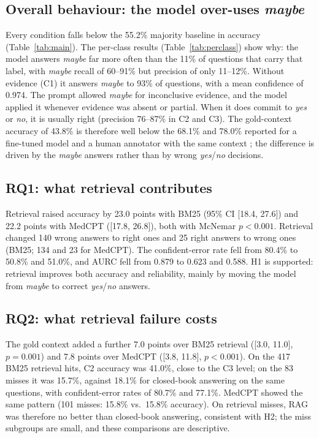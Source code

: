 \documentclass[conference]{IEEEtran}
\begin{document}
\subsection{Overall behaviour: the model over-uses \emph{maybe}}
Every condition falls below the 55.2\% majority baseline in accuracy
(Table~\ref{tab:main}). The per-class results (Table~\ref{tab:perclass}) show
why: the model answers \emph{maybe} far more often than the 11\% of questions
that carry that label, with \emph{maybe} recall of 60--91\% but precision of only
11--12\%. Without evidence (C1) it answers \emph{maybe} to 93\% of questions,
with a mean confidence of 0.974. The prompt allowed \emph{maybe} for inconclusive
evidence, and the model applied it whenever evidence was absent or partial. When
it does commit to \emph{yes} or \emph{no}, it is usually right (precision
76--87\% in C2 and C3). The gold-context accuracy of 43.8\% is therefore well
below the 68.1\% and 78.0\% reported for a fine-tuned model and a human
annotator with the same context \cite{jin2019pubmedqa}; the difference is driven
by the \emph{maybe} answers rather than by wrong \emph{yes}/\emph{no} decisions.

\subsection{RQ1: what retrieval contributes}
Retrieval raised accuracy by 23.0 points with BM25 (95\% CI [18.4, 27.6]) and
22.2 points with MedCPT ([17.8, 26.8]), both with McNemar $p<0.001$. Retrieval
changed 140 wrong answers to right ones and 25 right answers to wrong ones (BM25;
134 and 23 for MedCPT). The confident-error rate fell from 80.4\% to 50.8\% and
51.0\%, and AURC fell from 0.879 to 0.623 and 0.588. H1 is supported: retrieval
improves both accuracy and reliability, mainly by moving the model from
\emph{maybe} to correct \emph{yes}/\emph{no} answers.

\subsection{RQ2: what retrieval failure costs}
The gold context added a further 7.0 points over BM25 retrieval ([3.0, 11.0],
$p=0.001$) and 7.8 points over MedCPT ([3.8, 11.8], $p<0.001$). On the 417 BM25
retrieval hits, C2 accuracy was 41.0\%, close to the C3 level; on the 83 misses
it was 15.7\%, against 18.1\% for closed-book answering on the same questions,
with confident-error rates of 80.7\% and 77.1\%. MedCPT showed the same pattern
(101 misses: 15.8\% vs.\ 15.8\% accuracy). On retrieval misses, RAG was therefore
no better than closed-book answering, consistent with H2; the miss subgroups are
small, and these comparisons are descriptive.
\end{document}
